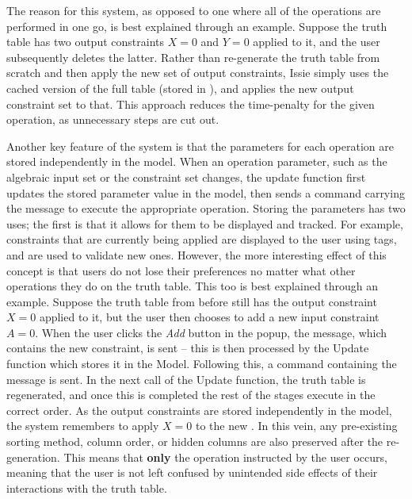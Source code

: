The reason for this system, as opposed to one where all of the operations are performed in one go, is best explained through an example.
Suppose the truth table has two output constraints $X=0$ and $Y = 0$ applied to it, and the user subsequently deletes the latter. Rather than re-generate the truth table from scratch and then apply the new set of output constraints, Issie simply uses the cached version of the full table (stored in ), and applies the new output constraint set to that. This approach reduces the time-penalty for the given operation, as unnecessary steps are cut out.

Another key feature of the system is that the parameters for each operation are stored independently in the model. When an operation parameter, such as the algebraic input set or the constraint set changes, the update function first updates the stored parameter value in the model, then sends a command carrying the message to execute the appropriate operation.
Storing the parameters has two uses; the first is that it allows for them to be displayed and tracked. For example, constraints that are currently being applied are displayed to the user using tags, and are used to validate new ones. However, the more interesting effect of this concept is that users do not lose their preferences no matter what other operations they do on the truth table. This too is best explained through an example. Suppose the truth table from before still has the output constraint $X=0$ applied to it, but the user then chooses to add a new input constraint $A=0$. When the user clicks the \textit{Add} button in the popup, the  message, which contains the new constraint, is sent -- this is then processed by the Update function which stores it in the Model. Following this, a command containing the message  is sent.  In the next call of the Update function, the truth table is regenerated, and once this is completed the rest of the stages execute in the correct order. As the output constraints are stored independently in the model, the system remembers to apply $X=0$ to the new . In this vein, any pre-existing sorting method, column order, or hidden columns are also preserved after the re-generation. This means that \textbf{only} the operation instructed by the user occurs, meaning that the user is not left confused by unintended side effects of their interactions with the truth table.


